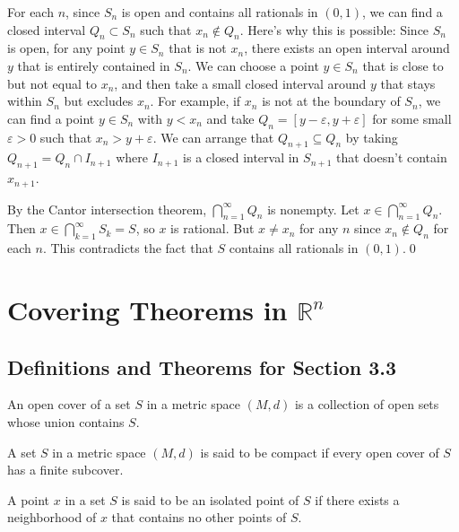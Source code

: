 For each $n$, since $S_n$ is open and contains all rationals in $(0,1)$, we can find a closed interval $Q_n \subset S_n$ such that $x_n \notin Q_n$. Here's why this is possible: Since $S_n$ is open, for any point $y \in S_n$ that is not $x_n$, there exists an open interval around $y$ that is entirely contained in $S_n$. We can choose a point $y \in S_n$ that is close to but not equal to $x_n$, and then take a small closed interval around $y$ that stays within $S_n$ but excludes $x_n$. For example, if $x_n$ is not at the boundary of $S_n$, we can find a point $y \in S_n$ with $y < x_n$ and take $Q_n = [y - \varepsilon, y + \varepsilon]$ for some small $\varepsilon > 0$ such that $x_n > y + \varepsilon$. We can arrange that $Q_{n+1} \subseteq Q_n$ by taking $Q_{n+1} = Q_n \cap I_{n+1}$ where $I_{n+1}$ is a closed interval in $S_{n+1}$ that doesn't contain $x_{n+1}$.

By the Cantor intersection theorem, $\bigcap_{n=1}^{\infty} Q_n$ is nonempty. Let $x \in \bigcap_{n=1}^{\infty} Q_n$. Then $x \in \bigcap_{k=1}^{\infty} S_k = S$, so $x$ is rational. But $x \neq x_n$ for any $n$ since $x_n \notin Q_n$ for each $n$. This contradicts the fact that $S$ contains all rationals in $(0,1)$.\qed
\section{Covering Theorems in $\mathbb{R}^n$}

\subsection*{Definitions and Theorems for Section 3.3}

\begin{definition}
An open cover of a set $S$ in a metric space $(M,d)$ is a collection of open sets whose union contains $S$.
\end{definition}

\begin{definition}
A set $S$ in a metric space $(M,d)$ is said to be compact if every open cover of $S$ has a finite subcover.
\end{definition}

\begin{definition}
A point $x$ in a set $S$ is said to be an isolated point of $S$ if there exists a neighborhood of $x$ that contains no other points of $S$.
\end{definition}


